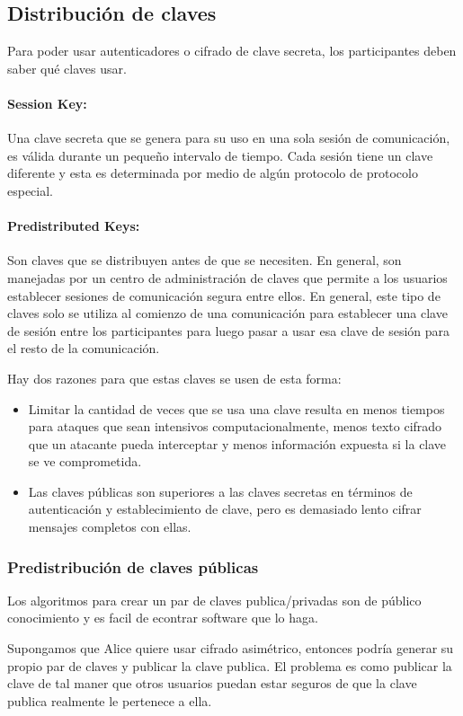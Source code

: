 \subsection{Distribución de claves}
Para poder usar autenticadores o cifrado de clave secreta, los participantes deben saber qué claves usar.

\paragraph{Session Key:} Una clave secreta que se genera para su uso en una sola sesión de comunicación, es válida durante un pequeño intervalo de tiempo. Cada sesión tiene un clave diferente y esta es determinada por medio de algún protocolo de protocolo especial. 

\paragraph{Predistributed Keys:} Son claves que se distribuyen antes de que se necesiten. En general, son manejadas por un centro de administración de claves que permite a los usuarios establecer sesiones de comunicación segura entre ellos. En general, este tipo de claves solo se utiliza al comienzo de una comunicación para establecer una clave de sesión entre los participantes para luego pasar a usar esa clave de sesión para el resto de la comunicación.

Hay dos razones para que estas claves se usen de esta forma:
\begin{itemize}
  \item Limitar la cantidad de veces que se usa una clave resulta en menos tiempos para ataques que sean intensivos computacionalmente, menos texto cifrado que un atacante pueda interceptar y menos información expuesta si la clave se ve comprometida.
  \item Las claves públicas son superiores a las claves secretas en términos de autenticación y establecimiento de clave, pero es demasiado lento cifrar mensajes completos con ellas.
\end{itemize}

\subsubsection{Predistribución de claves públicas}
Los algoritmos para crear un par de claves publica/privadas son de público conocimiento y es facil de econtrar software que lo haga. 

Supongamos que Alice quiere usar cifrado asimétrico, entonces podría generar su propio par de claves y publicar la clave publica. El problema es como publicar la clave de tal maner que otros usuarios puedan estar seguros de que la clave publica realmente le pertenece a ella.

